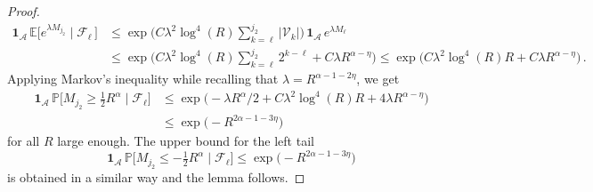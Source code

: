 \documentclass[11pt]{amsart}
\theoremstyle{definition}
\theoremstyle{remark}
\numberwithin{equation}{section}
\def\la{{\lambda}}
\newcommand{\bP}{\mathbb P}
\newcommand{\bE}{\mathbb E}
\begin{document}
\begin{proof}
		\begin{align*}
			\mathbf{1}_{\mathcal{A}} \, \bE\Big[ e^{\la M_{j_2}}\mid \mathcal{F}_\ell \, \Big] &\le \exp\Big(C\la^2 \log^4(R) \sum_{k=\ell}^{j_2} |\mathcal{V}_{k}|\Big) \,  \mathbf{1}_{\mathcal{A}} \, e^{\la M_\ell} \\ &\le \exp\Big(C\la^2 \log^4(R) \sum_{k=\ell}^{j_2} 2^{k-\ell} + C\la R^{\alpha-\eta}\Big) \le \exp\Big(C\la^2 \log^4(R) R + C\la R^{\alpha -\eta}\Big) \, .
		\end{align*}
		Applying Markov's inequality while recalling that $\la = R^{\alpha-1-2\eta}$, we get
		\begin{align*}
			\mathbf{1}_{\mathcal{A}} \, \bP\Big[ M_{j_2}  \ge \tfrac{1}{2} R^{\alpha} \mid \mathcal{F}_\ell\Big] &\le \exp\Big(-\la R^\alpha/2 + C\la^2 \log^4(R) R + 4\la R^{\alpha -\eta}\Big) \\ & \le \exp\Big(-R^{2\alpha-1-3\eta}\Big)
		\end{align*} 
		for all $R$ large enough. The upper bound for the left tail
		\[
		\mathbf{1}_{\mathcal{A}} \, \bP\Big[ M_{j_2}  \le - \tfrac{1}{2} R^{\alpha} \mid \mathcal{F}_\ell\Big] \le \exp\Big(-R^{2\alpha-1-3\eta}\Big)
		\]
		is obtained in a similar way and the lemma follows.
	\end{proof}
\end{document}
